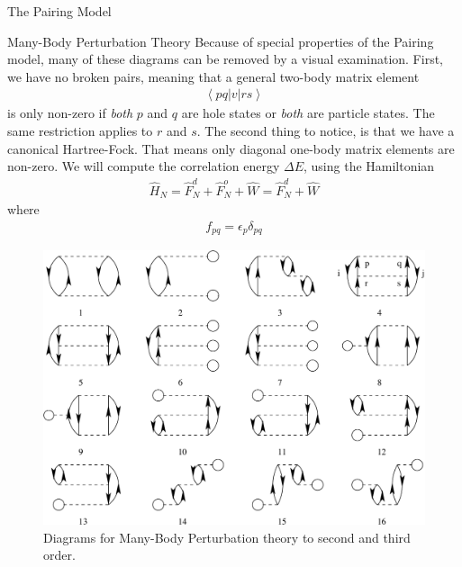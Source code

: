 \documentclass[twoside,english]{uiofysmaster}
\begin{document}
\begin{chapter}{The Pairing Model}
\begin{section}{Many-Body Perturbation Theory}
		Because of special properties of the Pairing model, many of these diagrams can be removed by a visual examination. First, we have no broken pairs, meaning that a general two-body matrix element 
		\begin{align}
			\left< pq | v | rs \right> 
		\end{align}
		is only non-zero if \textit{both} $p$ and $q$ are hole states or \textit{both} are particle states. The same restriction applies to $r$ and $s$. The second thing to notice, is that we have a canonical Hartree-Fock. That means only diagonal one-body matrix elements are non-zero. We will compute the correlation energy $\Delta E$, using the Hamiltonian
		\begin{align}
			\hat H_N = \hat F_N^d + \hat F_N^o + \hat W = \hat F_N^d + \hat W
		\end{align}
		where
		\begin{align}
			f_{pq} = \epsilon_p \delta_{pq}
		\end{align}
 		\begin{figure}[H]
			\includegraphics[width=\textwidth]{Figures/FirstSecondThirdOrder.pdf}
			\caption{Diagrams for Many-Body Perturbation theory to second and third order. }
			\label{figure:mbpt23}
		\end{figure}


\end{section}
\end{chapter}
\end{document}
